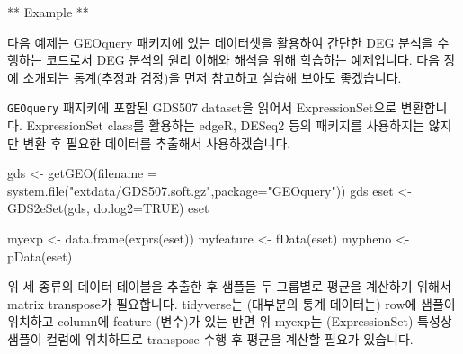 \documentclass[
]{book}
\newenvironment{Shaded}{\begin{snugshade}}{\end{snugshade}}
\newcommand{\AttributeTok}[1]{\textcolor[rgb]{0.77,0.63,0.00}{#1}}
\newcommand{\ConstantTok}[1]{\textcolor[rgb]{0.00,0.00,0.00}{#1}}
\newcommand{\DocumentationTok}[1]{\textcolor[rgb]{0.56,0.35,0.01}{\textbf{\textit{#1}}}}
\newcommand{\FunctionTok}[1]{\textcolor[rgb]{0.00,0.00,0.00}{#1}}
\newcommand{\NormalTok}[1]{#1}
\newcommand{\OtherTok}[1]{\textcolor[rgb]{0.56,0.35,0.01}{#1}}
\newcommand{\SpecialCharTok}[1]{\textcolor[rgb]{0.00,0.00,0.00}{#1}}
\newcommand{\StringTok}[1]{\textcolor[rgb]{0.31,0.60,0.02}{#1}}
\begin{document}
** Example **

다음 예제는 GEOquery 패키지에 있는 데이터셋을 활용하여 간단한 DEG 분석을 수행하는 코드로서 DEG 분석의 원리 이해와 해석을 위해 학습하는 예제입니다. 다음 장에 소개되는 통계(추정과 검정)을 먼저 참고하고 실습해 보아도 좋겠습니다.

\texttt{GEOquery} 패지키에 포함된 GDS507 dataset을 읽어서 ExpressionSet으로 변환합니다. ExpressionSet class를 활용하는 edgeR, DESeq2 등의 패키지를 사용하지는 않지만 변환 후 필요한 데이터를 추출해서 사용하겠습니다.

\begin{Shaded}
\begin{Highlighting}[]
\NormalTok{gds }\OtherTok{\textless{}{-}} \FunctionTok{getGEO}\NormalTok{(}\AttributeTok{filename =} \FunctionTok{system.file}\NormalTok{(}\StringTok{"extdata/GDS507.soft.gz"}\NormalTok{,}\AttributeTok{package=}\StringTok{"GEOquery"}\NormalTok{))}
\NormalTok{gds}
\NormalTok{eset }\OtherTok{\textless{}{-}} \FunctionTok{GDS2eSet}\NormalTok{(gds, }\AttributeTok{do.log2=}\ConstantTok{TRUE}\NormalTok{)}
\NormalTok{eset}

\NormalTok{myexp }\OtherTok{\textless{}{-}} \FunctionTok{data.frame}\NormalTok{(}\FunctionTok{exprs}\NormalTok{(eset))}
\NormalTok{myfeature }\OtherTok{\textless{}{-}} \FunctionTok{fData}\NormalTok{(eset)}
\NormalTok{mypheno }\OtherTok{\textless{}{-}} \FunctionTok{pData}\NormalTok{(eset)}
\end{Highlighting}
\end{Shaded}

위 세 종류의 데이터 테이블을 추출한 후 샘플들 두 그룹별로 평균을 계산하기 위해서 matrix transpose가 필요합니다. tidyverse는 (대부분의 통계 데이터는) row에 샘플이 위치하고 column에 feature (변수)가 있는 반면 위 myexp는 (ExpressionSet) 특성상 샘플이 컬럼에 위치하므로 transpose 수행 후 평균을 계산할 필요가 있습니다.

\begin{Shaded}
\end{Shaded}
\end{document}
